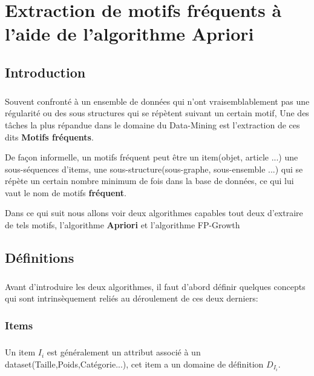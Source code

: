 \chapter{Extraction de motifs fréquents à l'aide de l'algorithme Apriori}
	\section{Introduction}
		\paragraph{}
		Souvent confronté à un ensemble de données qui n'ont vraisemblablement pas une régularité ou des sous structures qui se répètent suivant un certain motif, Une des tâches la plus répandue dans le domaine du Data-Mining est l'extraction de ces dits \textbf{Motifs fréquents}.
		\par 
		De façon informelle, un motifs fréquent peut être un item(objet, article ...) une sous-séquences d'items, une sous-structure(sous-graphe, sous-ensemble ...) qui se répète un certain nombre minimum de fois dans la base de données, ce qui lui vaut le nom de motifs \textbf{fréquent}\cite{Han}.
		\par 
		Dans ce qui suit nous allons voir deux algorithmes capables tout deux d'extraire de tels motifs, l'algorithme \textbf{Apriori} \cite{Agrawal:1994:FAM:645920.672836} et l'algorithme FP-Growth \cite{Hanfp}
		
	\section{Définitions}
		\paragraph{}
		Avant d'introduire les deux algorithmes, il faut d'abord définir quelques concepts qui sont intrinsèquement reliés au déroulement de ces deux derniers:
		\subsection*{Items}
			\paragraph{}
			Un item $I_i$ est généralement un attribut associé à un dataset(Taille,Poids,Catégorie...), cet item a un domaine de définition $D_{I_i}$.
		
